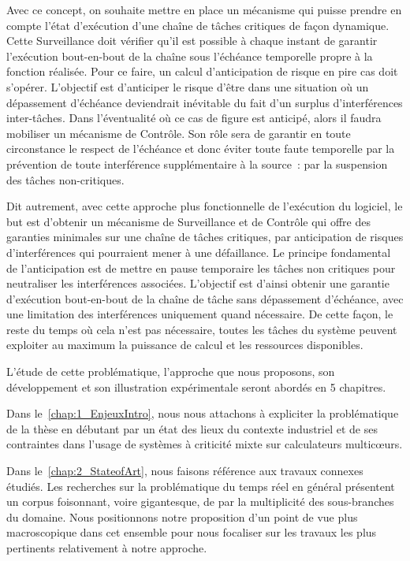 \documentclass[french, a4paper, 11pt, twoside, pdftex]{StyleThese}
\begin{document}
Avec ce concept, on souhaite mettre en place un mécanisme qui puisse prendre en compte l'état d'exécution d'une chaîne de tâches critiques de façon dynamique. Cette Surveillance doit vérifier qu'il est possible à chaque instant de garantir l'exécution bout-en-bout de la chaîne sous l'échéance temporelle propre à la fonction réalisée. Pour ce faire, un calcul d'anticipation de risque en pire cas doit s'opérer. L'objectif est d'anticiper le risque d'être dans une situation où un dépassement d'échéance deviendrait inévitable du fait d'un surplus d'interférences inter-tâches. Dans l'éventualité où ce cas de figure est anticipé, alors il faudra mobiliser un mécanisme de Contrôle. Son rôle sera de garantir en toute circonstance le respect de l'échéance et donc éviter toute faute temporelle par la prévention de toute interférence supplémentaire à la source~: par la suspension des tâches non-critiques.

Dit autrement, avec cette approche plus fonctionnelle de l'exécution du logiciel, le but est d'obtenir un mécanisme de Surveillance et de Contrôle qui offre des garanties minimales sur une chaîne de tâches critiques, par anticipation de risques d'interférences qui pourraient mener à une défaillance. Le principe fondamental de l'anticipation est de mettre en pause temporaire les tâches non critiques pour neutraliser les interférences associées. L'objectif est d'ainsi obtenir une garantie d'exécution bout-en-bout de la chaîne de tâche sans dépassement d'échéance, avec une limitation des interférences uniquement quand nécessaire. De cette façon, le reste du temps où cela n'est pas nécessaire, toutes les tâches du système peuvent exploiter au maximum la puissance de calcul et les ressources disponibles.

\smallbreak
\smallbreak
L’étude de cette problématique, l’approche que nous proposons, son développement et son
illustration expérimentale seront abordés en 5 chapitres.

Dans le~\autoref{chap:1_EnjeuxIntro}, nous nous attachons à expliciter la problématique de la thèse en débutant par un état des lieux du contexte industriel et de ses contraintes dans l'usage de systèmes à criticité mixte sur calculateurs multicœurs.

Dans le~\autoref{chap:2_StateofArt}, nous faisons référence aux travaux connexes étudiés. Les recherches sur la problématique du temps réel en général présentent un corpus foisonnant, voire gigantesque, de par la multiplicité des sous-branches du domaine. Nous positionnons notre proposition d'un point de vue plus macroscopique dans cet ensemble pour nous focaliser sur les travaux les plus pertinents relativement à notre approche.
\end{document}
